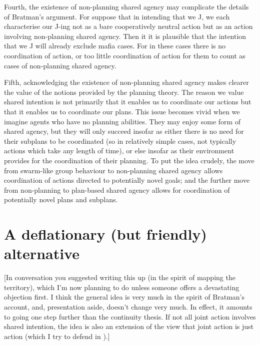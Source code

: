 \documentclass[12pt,letterpaper]{extarticle}
\begin{document}
Fourth, the existence of non-planning shared agency may complicate the details of Bratman's argument.
For suppose that in intending that we J, we each characterise our J-ing not as a bare cooperatively neutral action but as an action involving non-planning shared agency.
Then it it is plausible that the intention that we J will already exclude mafia cases.
For in these cases there is no coordination of action, or too little coordination of action for them to count as cases of non-planning shared agency.

Fifth, acknowledging the existence of non-planning shared agency makes clearer the value of the notions provided by the planning theory.
The reason we value shared intention is not primarily that it enables us to coordinate our actions but that it enables us to coordinate our plans.
This issue becomes vivid when we imagine agents who have no planning abilities.
They may enjoy some form of shared agency, but they will only succeed insofar as either there is no need for their subplans to be coordinated (so in relatively simple cases, not typically actions which take any length of time), or else insofar as their environment provides for the coordination of their planning.
To put the idea crudely, the move from swarm-like group behaviour to non-planning shared agency allows coordination of actions directed to potentially novel goals; and the further move from non-planning to plan-based shared agency allows for coordination of potentially novel plans and subplans.





\section{A deflationary (but friendly) alternative}
\label{deflationary}

[In conversation you suggested writing this up (in the spirit of mapping the territory), which I'm now planning to do unless someone offers a devastating objection first.
I think the general idea is very much in the spirit of Bratman's account, and, presentation aside, doesn't change very much.
In effect, it amounts to going one step further than the continuity thesis.
If not all joint action involves shared intention, the idea is also an extension of the view that joint action is just action (which I try to defend in \citet{Butterfill:2011_wija}).]
\end{document}
